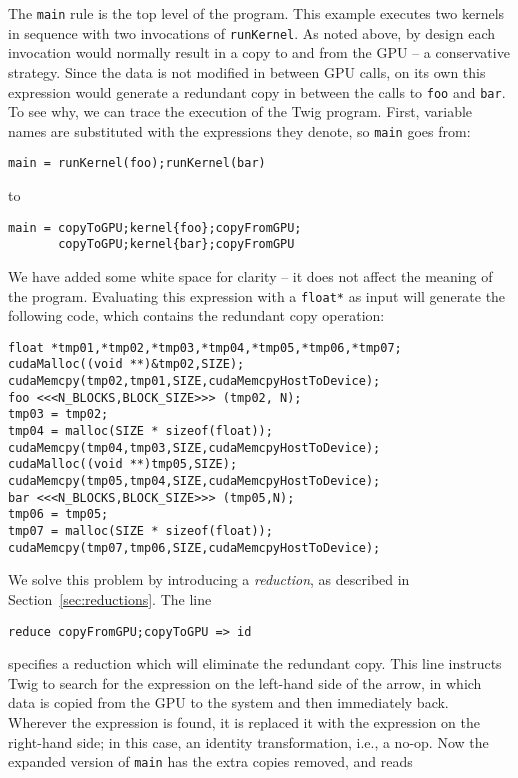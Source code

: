 The \texttt{main} rule is the top level of the program. This example executes two kernels in sequence with two invocations of \texttt{runKernel}. As noted above, by design each invocation would normally result in a copy to and from the GPU -- a conservative strategy. Since the data is not modified in between GPU calls, on its own this expression would generate a redundant copy in between the calls to \texttt{foo} and \texttt{bar}. To see why, we can trace the execution of the Twig program. First, variable names are substituted with the expressions they denote, so \texttt{main} goes from:

\begin{verbatim}
main = runKernel(foo);runKernel(bar)
\end{verbatim}

to 

\begin{verbatim}
main = copyToGPU;kernel{foo};copyFromGPU;
       copyToGPU;kernel{bar};copyFromGPU
\end{verbatim}

We have added some white space for clarity -- it does not affect the meaning of the program. Evaluating this expression with a \texttt{float*} as input will generate the following code, which contains the redundant copy operation:

\begin{verbatim}
float *tmp01,*tmp02,*tmp03,*tmp04,*tmp05,*tmp06,*tmp07;
cudaMalloc((void **)&tmp02,SIZE);
cudaMemcpy(tmp02,tmp01,SIZE,cudaMemcpyHostToDevice);
foo <<<N_BLOCKS,BLOCK_SIZE>>> (tmp02, N);
tmp03 = tmp02;
tmp04 = malloc(SIZE * sizeof(float));
cudaMemcpy(tmp04,tmp03,SIZE,cudaMemcpyHostToDevice);
cudaMalloc((void **)tmp05,SIZE);
cudaMemcpy(tmp05,tmp04,SIZE,cudaMemcpyHostToDevice);
bar <<<N_BLOCKS,BLOCK_SIZE>>> (tmp05,N);
tmp06 = tmp05;
tmp07 = malloc(SIZE * sizeof(float));
cudaMemcpy(tmp07,tmp06,SIZE,cudaMemcpyHostToDevice);
\end{verbatim}

We solve this problem by introducing a \emph{reduction}, as described in Section~\ref{sec:reductions}. The line

\begin{verbatim}
reduce copyFromGPU;copyToGPU => id
\end{verbatim}

specifies a reduction which will eliminate the redundant copy. This line instructs Twig to search for the expression on the left-hand side of the arrow, in which data is copied from the GPU to the system and then immediately back. Wherever the expression is found, it is replaced it with the expression on the right-hand side; in this case, an identity transformation, i.e., a no-op. Now the expanded version of \texttt{main} has the extra copies removed, and reads

